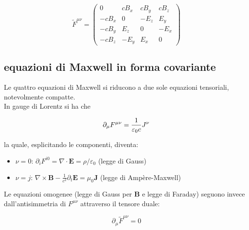 \begin{equation}
    \tilde{F}^{\mu\nu} = 
    \begin{pmatrix} 
    0 & cB_x & cB_y & cB_z \\ 
    -cB_x & 0 & -E_z & E_y \\ 
    -cB_y & E_z & 0 & -E_x \\ 
    -cB_z & -E_y & E_x & 0 
    \end{pmatrix}
\end{equation}

\subsection{equazioni di Maxwell in forma covariante }

Le quattro equazioni di Maxwell si riducono a due sole equazioni tensoriali, notevolmente compatte.\\

In gauge di Lorentz si ha che

\begin{tcolorbox}[colback=yellow!10!white, colframe=orange!70!black, boxrule=0.8pt]
\begin{equation} \label{eq: Maxwell_covariante_1}
    \partial_{\mu} F^{\mu \nu} = \frac{1}{\varepsilon_0 c} J^{\nu}
\end{equation}
\end{tcolorbox}

la quale, esplicitando le componenti, diventa:

\begin{itemize}
    \item $\nu = 0$: $\partial_i F^{i0} = \nabla\cdot\mathbf{E} = \rho/\varepsilon_0$ \quad (legge di Gauss)
    \item $\nu = j$: $\nabla\times\mathbf{B} - \frac{1}{c^2}\partial_t\mathbf{E} = \mu_0\mathbf{J}$ \quad (legge di Ampère-Maxwell)
\end{itemize}

Le equazioni omogenee (legge di Gauss per $\mathbf{B}$ e legge di Faraday) seguono invece dall'antisimmetria di $F^{\mu\nu}$ attraverso il tensore duale:

\begin{tcolorbox}[colback=yellow!10!white, colframe=orange!70!black, boxrule=0.8pt]
\begin{equation}\label{eq: Maxwell_covariante_2}
    \partial_\mu \tilde{F}^{\mu\nu} = 0
\end{equation}
\end{tcolorbox}

